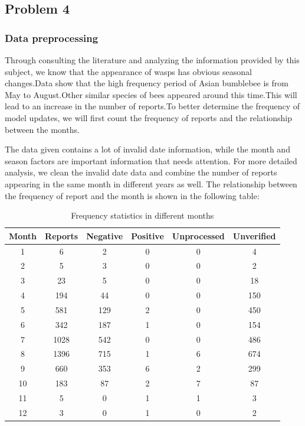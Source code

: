 \documentclass{mcmthesis}
\begin{document}
\hspace*{\fill}
\subsection{Problem 4}

\subsubsection{Data preprocessing}
Through consulting the literature and analyzing the information provided by this subject, we know that the appearance of wasps has obvious seasonal changes.Data show that the high frequency period of Asian bumblebee is from May to August.Other similar species of bees appeared around this time.This will lead to an increase in the number of reports.To better determine the frequency of model updates, we will first count the frequency of reports and the relationship between the months.

The data given contains a lot of invalid date information, while the month and season factors are important information that needs attention. For more detailed analysis, we clean the invalid date data and combine the number of reports appearing in the same month in different years as well. 
The relationship between the frequency of report and the month is shown in the following table:

\begin{table}[H]   %
	\centering	\caption{Frequency statistics in different months}
	\begin{tabular}{cccccc}
		\toprule[1.5pt]
Month & Reports & Negative & Positive & Unprocessed & Unverified \\
		\midrule[1pt]
		1     & 6       & 2        & 0        & 0           & 4          \\
		2     & 5       & 3        & 0        & 0           & 2          \\
		3     & 23      & 5        & 0        & 0           & 18         \\
		4     & 194     & 44       & 0        & 0           & 150        \\
		5     & 581     & 129      & 2        & 0           & 450        \\
		6     & 342     & 187      & 1        & 0           & 154        \\
		7     & 1028    & 542      & 0        & 0           & 486        \\
		8     & 1396    & 715      & 1        & 6           & 674        \\
		9     & 660     & 353      & 6        & 2           & 299        \\
		10    & 183     & 87       & 2        & 7           & 87         \\
		11    & 5       & 0        & 1        & 1           & 3          \\
		12    & 3       & 0        & 1        & 0           & 2         \\
		\bottomrule[1.5pt]
	\end{tabular}
\end{table}
\end{document}

